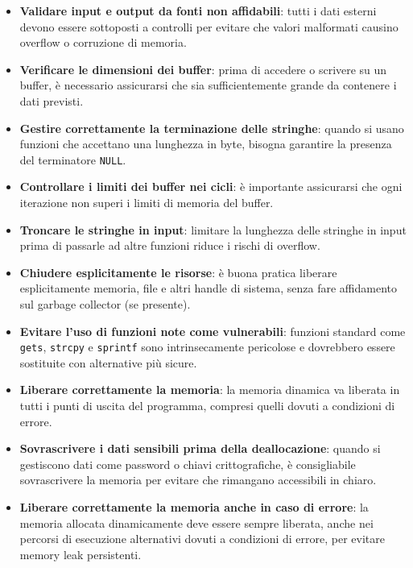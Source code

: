 \begin{itemize}
  \item \textbf{Validare input e output da fonti non affidabili}: tutti i dati esterni
    devono essere sottoposti a controlli per evitare che valori malformati causino
    overflow o corruzione di memoria.

  \item \textbf{Verificare le dimensioni dei buffer}: prima di accedere o scrivere
    su un buffer, è necessario assicurarsi che sia sufficientemente grande da
    contenere i dati previsti.

  \item \textbf{Gestire correttamente la terminazione delle stringhe}: quando si
    usano funzioni che accettano una lunghezza in byte, bisogna garantire la
    presenza del terminatore \texttt{NULL}.

  \item \textbf{Controllare i limiti dei buffer nei cicli}: è importante assicurarsi
    che ogni iterazione non superi i limiti di memoria del buffer.

  \item \textbf{Troncare le stringhe in input}: limitare la lunghezza delle stringhe
    in input prima di passarle ad altre funzioni riduce i rischi di overflow.

  \item \textbf{Chiudere esplicitamente le risorse}: è buona pratica liberare esplicitamente
    memoria, file e altri handle di sistema, senza fare affidamento sul garbage collector
    (se presente).

  \item \textbf{Evitare l'uso di funzioni note come vulnerabili}: funzioni standard
    come \texttt{gets}, \texttt{strcpy} e \texttt{sprintf} sono intrinsecamente pericolose
    e dovrebbero essere sostituite con alternative più sicure.

  \item \textbf{Liberare correttamente la memoria}: la memoria dinamica va liberata
    in tutti i punti di uscita del programma, compresi quelli dovuti a
    condizioni di errore.

  \item \textbf{Sovrascrivere i dati sensibili prima della deallocazione}: quando
    si gestiscono dati come password o chiavi crittografiche, è consigliabile
    sovrascrivere la memoria per evitare che rimangano accessibili in chiaro.

  \item \textbf{Liberare correttamente la memoria anche in caso di errore}: la memoria
    allocata dinamicamente deve essere sempre liberata, anche nei percorsi di
    esecuzione alternativi dovuti a condizioni di errore, per evitare memory leak
    persistenti.
\end{itemize}

